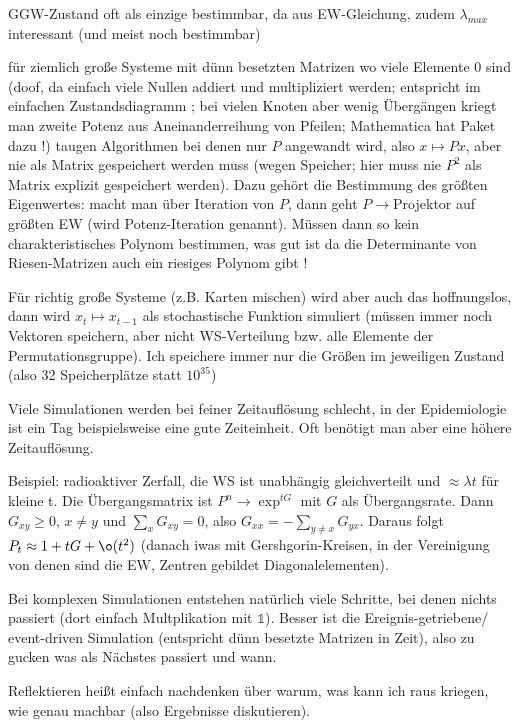 GGW-Zustand oft als einzige bestimmbar, da aus EW-Gleichung, zudem $\lambda_{max}$ interessant (und meist noch bestimmbar)

für ziemlich große Systeme mit dünn besetzten Matrizen wo viele Elemente 0 sind (doof, da einfach viele Nullen addiert und multipliziert werden; entspricht im einfachen Zustandsdiagramm ; bei vielen Knoten aber wenig Übergängen kriegt man zweite Potenz aus Aneinanderreihung von Pfeilen; Mathematica hat Paket dazu !) taugen Algorithmen bei denen nur $P$ angewandt wird, also $x \mapsto Px$, aber nie als Matrix gespeichert werden muss (wegen Speicher; hier muss nie $P^2$ als Matrix explizit gespeichert werden).
Dazu gehört die Bestimmung des größten Eigenwertes: macht man über Iteration von $P$, dann geht $P \rightarrow$Projektor auf größten EW (wird Potenz-Iteration genannt). Müssen dann so kein charakteristisches Polynom bestimmen, was gut ist da die Determinante von Riesen-Matrizen auch ein riesiges Polynom gibt !

Für richtig große Systeme (z.B. Karten mischen) wird aber auch das hoffnungslos, dann wird $x_t \mapsto x_{t-1}$ als stochastische Funktion simuliert (müssen immer noch Vektoren speichern, aber nicht WS-Verteilung bzw. alle Elemente der Permutationsgruppe). Ich speichere immer nur die Größen im jeweiligen Zustand (also 32 Speicherplätze statt $10^{35}$)


Viele Simulationen werden bei feiner Zeitauflösung schlecht, in der Epidemiologie ist ein Tag beispielsweise eine gute Zeiteinheit. Oft benötigt man aber eine höhere Zeitauflösung.

Beispiel: radioaktiver Zerfall, die WS ist unabhängig gleichverteilt und $\approx \lambda t$ für kleine t. Die Übergangsmatrix ist $P^n \rightarrow \exp^{tG}$ mit $G$ als Übergangsrate.
Dann $G_{xy} \geq 0, \, x\neq y$ und $\sum\limits_x G_{xy} = 0$, also $G_{xx} = - \sum\limits_{y\neq x} G_{yx}$. Daraus folgt $P_t \approx 1 + tG + \o(t^2)$ (danach iwas mit Gershgorin-Kreisen, in der Vereinigung von denen sind die EW, Zentren gebildet Diagonalelementen).

Bei komplexen Simulationen entstehen natürlich viele Schritte, bei denen nichts passiert (dort einfach Multplikation mit $\mathds{1}$). Besser ist die Ereignis-getriebene/ event-driven Simulation (entspricht dünn besetzte Matrizen in Zeit), also zu gucken was als Nächstes passiert und wann.


Reflektieren heißt einfach nachdenken über warum, was kann ich raus kriegen, wie genau machbar (also Ergebnisse diskutieren).

